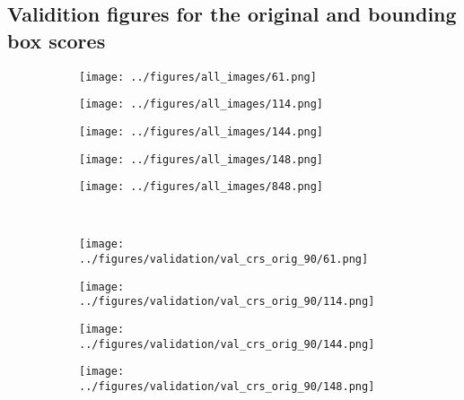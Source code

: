 \newpage
\subsection{Validition figures for the original and bounding box scores}
\begin{figure}[h!]
	\begin{subfigure}{0.19\textwidth}
		\centering
		\texttt{[image: ../figures/all\_images/61.png]}
		\label{fig:1}
	\end{subfigure}
	\begin{subfigure}{0.19\textwidth}
		\centering
		\texttt{[image: ../figures/all\_images/114.png]}
		\label{fig:1}
	\end{subfigure}
	\begin{subfigure}{0.19\textwidth}
		\centering
		\texttt{[image: ../figures/all\_images/144.png]}
		\label{fig:1}
	\end{subfigure}
	\begin{subfigure}{0.19\textwidth}
		\centering
		\texttt{[image: ../figures/all\_images/148.png]}
		\label{fig:1}
	\end{subfigure}
	\begin{subfigure}{0.19\textwidth}
		\centering
		\texttt{[image: ../figures/all\_images/848.png]}
		\label{fig:1}
	\end{subfigure}
	\vspace{-0.35cm}
	\\
	\begin{subfigure}{0.19\textwidth}
		\centering
		\texttt{[image: ../figures/validation/val\_crs\_orig\_90/61.png]}
		\label{fig:1}
	\end{subfigure}
	\begin{subfigure}{0.19\textwidth}
		\centering
		\texttt{[image: ../figures/validation/val\_crs\_orig\_90/114.png]}
		\label{fig:1}
	\end{subfigure}
	\begin{subfigure}{0.19\textwidth}
		\centering
		\texttt{[image: ../figures/validation/val\_crs\_orig\_90/144.png]}
		\label{fig:1}
	\end{subfigure}
	\begin{subfigure}{0.19\textwidth}
		\centering
		\texttt{[image: ../figures/validation/val\_crs\_orig\_90/148.png]}
		\label{fig:1}
	\end{subfigure}
	\begin{subfigure}{0.19\textwidth}

\end{subfigure}
\end{figure}

